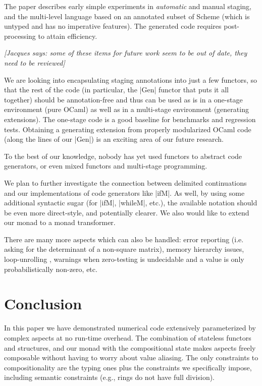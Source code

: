 \documentclass[draft]{elsart}
\newcommand{\jacques}[1]{{\it [Jacques says: #1]}}
\begin{document}
The paper \cite{GluckJ97} describes early simple experiments in
\emph{automatic} and manual staging, and the multi-level language
based on an annotated subset of Scheme (which is untyped and has no
imperative features). The generated code requires post-processing to
attain efficiency.  

\jacques{some of these items for future work seem to be out of date, they need
to be reviewed}

We are looking into encapsulating staging
annotations into just a few functors, so that the rest of the code (in
particular, the |Gen| functor that puts it all together) should be
annotation-free and thus can be used as is in a one-stage environment
(pure OCaml) as well as in a multi-stage environment (generating
extensions). The one-stage code is a good baseline for benchmarks and
regression tests. Obtaining a generating extension from properly
modularized OCaml code (along the lines of our |Gen|) is an exciting
area of our future research.

To the best of our knowledge, nobody has yet used functors to
abstract code generators, or even mixed functors and 
multi-stage programming.

We plan to further investigate the connection between delimited
continuations and our implementations of code generators like
|ifM|.  As well, by using some additional syntactic sugar
(for |ifM|, |whileM|, etc.), the available notation should be
even more direct-style, and potentially clearer.
We also would like to extend our monad to a monad transformer.

There are many more aspects which can also be handled:
error reporting (i.e. asking for the determinant of a 
non-square matrix), memory hierarchy issues, loop-unrolling
\cite{Padua:MetaOcaml:04},
warnings when zero-testing is undecidable and
a value is only probabilistically non-zero, etc.

\section{Conclusion}\label{conclusion}
In this paper we have demonstrated numerical code extensively parameterized
by complex aspects at no run-time overhead.  The combination of
stateless functors and structures, and our monad with the
compositional state makes aspects freely composable without having to
worry about value aliasing. The only constraints to compositionality
are the typing ones plus the constraints we specifically
impose, including semantic constraints (e.g., rings do not have full
division).
\end{document}
